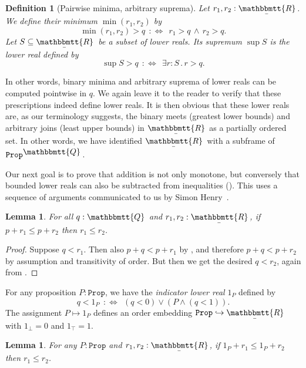 \documentclass[reqno,11pt]{amsproc}
\theoremstyle{plain}
\newtheorem{lemma}[theorem]{Lemma}
\newtheorem{definition}[theorem]{Definition}
\theoremstyle{definition}
\newcommand{\Const}[1]{\mathtt{#1}}
\newcommand{\ubar}[1]{\underaccent{\bar}{#1}}
\newcommand{\ind}[1]{1_{#1}}			%
\newcommand{\internal}[1]{\raisebox{-.03ex}{$\mathbbmtt{#1}$}}
\newcommand{\hs}{\hspace{1pt}}
\newcommand{\tqq}{\internal{Q}\hs}
\newcommand{\trr}{\internal{R}}
\newcommand{\tlrr}{\ubar{\trr}\hs}
\newcommand{\prop}{\Const{Prop}}
\renewcommand{\iff}{\Leftrightarrow}
\newcommand{\beq}{\begin{equation}}
\newcommand{\eeq}{\end{equation}}
\numberwithin{equation}{section}
\begin{document}
\begin{definition}[Pairwise minima, arbitrary suprema]\label{def.min_sup}
Let $r_1,r_2:\tlrr$. We define their \emph{minimum} $\min(r_1,r_2)$ by
\[
	\min(r_1, r_2) > q \:\::\iff\:\: r_1 > q \,\land\, r_2 > q.
\]
Let $S \subseteq \tlrr$ be a subset of lower reals.
Its \emph{supremum} $\sup S$ is the lower real defined  by 
\[
	\sup S > q \:\::\iff\:\: \exists r : S \,.\, r > q.
\]
\end{definition}

In other words, binary minima and arbitrary suprema of lower reals can be computed pointwise in $q$. We again leave it to the reader to verify that these prescriptions indeed define lower reals. It is then obvious that these lower reals are, as our terminology suggests, the binary meets (greatest lower bounds) and arbitrary joins (least upper bounds) in $\tlrr$ as a partially ordered set. In other words, we have identified $\tlrr$ with a subframe of $\prop^{\tqq}$.

Our next goal is to prove that addition is not only monotone, but conversely that bounded lower reals can also be subtracted from inequalities (). This uses a sequence of arguments communicated to us by Simon Henry~\cite{henry2012simplification}.

\begin{lemma}
	\label{cancel_rationals}
	For all $q:\tqq$ and $r_1,r_2:\tlrr$, if $p + r_1\le p + r_2$ then $r_1 \le r_2$.
\end{lemma}

\begin{proof}
	Suppose $q < r_1$. Then also $p + q < p + r_1$ by , and therefore $p + q < p + r_2$ by assumption and transitivity of order. But then we get the desired $q < r_2$, again from .
\end{proof}

For any proposition $P : \prop$, we have the \emph{indicator lower real} $\ind{P}$ defined by
\beq
	\label{indicator_lower_real}
	q < 1_P \:\::\iff\:\: (q < 0) \lor (P \land (q < 1)).
\eeq
The assignment $P \mapsto \ind{P}$ defines an order embedding $\prop \hookrightarrow \tlrr$ with $\ind{\bot} = 0$ and $\ind{\top} = 1$.

\begin{lemma}\label{order_cancel_props}
For any $P:\prop$ and $r_1,r_2:\tlrr$, if $\ind{P}+r_1\le \ind{P}+r_2$ then $r_1\le r_2$.
\end{lemma}
\end{document}
